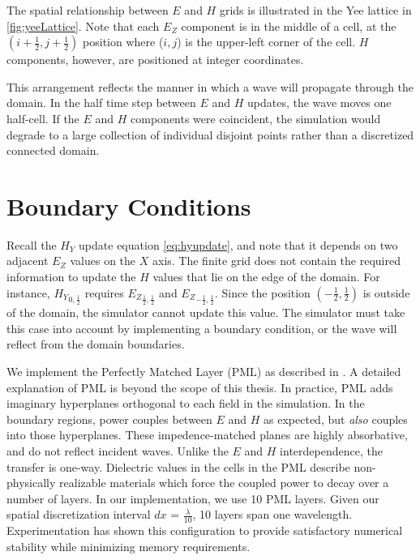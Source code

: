 The spatial relationship between $E$ and $H$ grids is illustrated in the Yee lattice in \autoref{fig:yeeLattice}. Note that each $E_Z$ component is in the middle of a cell, at the $(i + \frac{1}{2}, j + \frac{1}{2})$ position where ($i,j$) is  the upper-left corner of the cell. $H$ components, however, are positioned at integer coordinates.

This arrangement reflects the manner in which a wave will propagate through the domain. In the half time step between $E$ and $H$ updates, the wave moves one half-cell. If the $E$ and $H$ components were coincident, the simulation would degrade to a large collection of individual disjoint points rather than a discretized connected domain.


\section{Boundary Conditions}

Recall the $H_Y$ update equation \autoref{eq:hyupdate}, and note that it depends on two adjacent $E_Z$ values on the $X$ axis. The finite grid does not contain the required information to update the $H$ values that lie on the edge of the domain. For instance, ${H_Y}_{0,\frac{1}{2}}$ requires ${E_Z}_{\frac{1}{2},\frac{1}{2}}$ and ${E_Z}_{-\frac{1}{2},\frac{1}{2}}$. Since the position $(-\frac{1}{2},\frac{1}{2})$ is outside of the domain, the simulator cannot update this value. The simulator must take this case into account by implementing a boundary condition, or the wave will reflect from the domain boundaries. 

We implement the Perfectly Matched Layer (PML) as described in \cite{BERENGER1994185}. A detailed explanation of PML is beyond the scope of this thesis. In practice, PML adds imaginary hyperplanes orthogonal to each field in the simulation. In the boundary regions, power couples between $E$ and $H$ as expected, but \emph{also} couples into those hyperplanes. These impedence-matched planes are highly absorbative, and do not reflect incident waves. Unlike the $E$ and $H$ interdependence, the transfer is one-way. Dielectric values in the cells in the PML describe non-physically realizable materials which force the coupled power to decay over a number of layers. In our implementation, we use 10 PML layers. Given our spatial discretization interval $dx$ = $\frac{\lambda}{10}$, 10 layers span one wavelength. Experimentation has shown this configuration to provide satisfactory numerical stability while minimizing memory requirements.



